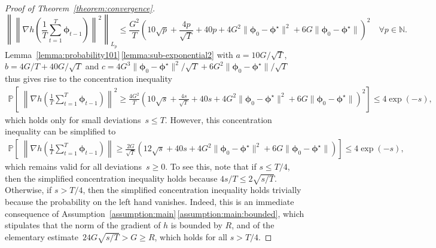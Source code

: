 \documentclass[11pt, a4paper, oneside, reqno]{article}
\begin{document}
\begin{proof} [Proof of Theorem~\ref{theorem:convergence}]
		\[
		    \left\| \left\| \nabla h \left(\frac{1}{T} \sum_{t=1}^{T} \bm \phi_{t-1} \right) \right\|^2 \right\|_{L_p} \leq \frac{G^{2}}{T} \left( 10 \sqrt{p} + \frac{4p}{\sqrt{T}} + 40 p + 4G^2 \| \bm \phi_0 - \bm \phi^\star \|^2 + 6G \| \bm \phi_0 - \bm \phi^\star \| \right)^2 \quad \forall p\in\mathbb N.
		\]
		Lemma~\ref{lemma:probability101}\,\ref{lemma:sub-exponential2} with $a = 10 G / \sqrt{T}$, $b = 4 G / T + 40 G / \sqrt{T}$ and $c = 4 G^3 \| \bm \phi_0 - \bm \phi^\star \|^2 / \sqrt{T} + 6 G^2 \| \bm \phi_0 - \bm \phi^\star \|/\sqrt{T}$ thus gives rise to the concentration inequality
		\begin{align*}
		    \mathbb P \left[ \;\left\| \nabla h \left(\frac{1}{T} \sum_{t=1}^{T} \bm \phi_{t-1} \!\right) \right\|^2 
		    \!\!\!\geq\! \frac{4G^2}{T} \left( 10 \sqrt{s} + \frac{4s}{\sqrt{T}} + 40 s + 4 G^2 \| \bm \phi_0 - \bm \phi^\star \|^2 + 6 G \| \bm \phi_0 - \bm \phi^\star \| \right)^2 \right] \leq 4 \exp(-s),
		\end{align*}
		which holds only for small deviations~$s\leq T$. However, this concentration inequality can be simplified to
		\begin{align*}
		    \mathbb P \left[ \;\left\| \nabla h \left(\frac{1}{T} \sum_{t=1}^{T} \bm \phi_{t-1} \right) \right\| 
		    \geq \frac{2G}{\sqrt{T}} \left( 12 \sqrt{s} + 40 s + 4 G^2 \| \bm \phi_0 - \bm \phi^\star \|^2 + 6 G \| \bm \phi_0 - \bm \phi^\star \| \right) \right] \leq 4 \exp(-s),
		\end{align*}
		which remains valid for all deviations~$ s\ge 0$. To see this, note that if $ s \leq T/4 $, then the simplified concentration inequality holds because $ 4 s / T \leq 2 \sqrt{s / T}$. Otherwise, if $ s > T/4 $, then the simplified concentration inequality holds trivially because the probability on the left hand vanishes. Indeed, this is an immediate consequence of Assumption~\ref{assumption:main}\,\ref{assumption:main:bounded}, which stipulates that the norm of the gradient of $h$ is bounded by $R$, and of the elementary estimate~$24 G \sqrt{s / T} > G\geq R$, which holds for all $s > T / 4$.
		

\end{proof}
\end{document}
